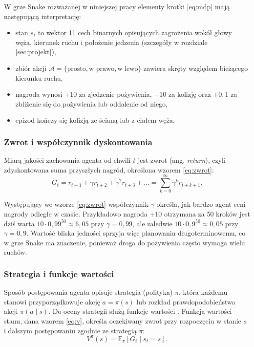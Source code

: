 W grze Snake rozważanej w niniejszej pracy elementy krotki \eqref{eq:mdp} mają następującą interpretację:
\begin{itemize}
	\item stan $s_t$ to wektor 11 cech binarnych opisujących zagrożenia wokół głowy węża, kierunek ruchu i położenie jedzenia (szczegóły w rozdziale \ref{sec:projekt}),
	\item zbiór akcji $\mathcal{A} = \{\text{prosto}, \text{w prawo}, \text{w lewo}\}$ zawiera skręty względem bieżącego kierunku ruchu,
	\item nagroda wynosi $+10$ za zjedzenie pożywienia, $-10$ za kolizję oraz $\pm 0{,}1$ za zbliżenie się do pożywienia lub oddalenie od niego,
	\item epizod kończy się kolizją ze ścianą lub z ciałem węża.
\end{itemize}

\subsubsection{Zwrot i współczynnik dyskontowania}

Miarą jakości zachowania agenta od chwili $t$ jest zwrot (ang. \emph{return}), czyli zdyskontowana suma przyszłych nagród, określona wzorem \eqref{eq:zwrot}:
\begin{equation}
	G_t = r_{t+1} + \gamma r_{t+2} + \gamma^2 r_{t+3} + \ldots = \sum_{k=0}^{\infty} \gamma^k r_{t+k+1}.
	\label{eq:zwrot}
\end{equation}

Występujący we wzorze \eqref{eq:zwrot} współczynnik $\gamma$ określa, jak bardzo agent ceni nagrody odległe w czasie. Przykładowo nagroda $+10$ otrzymana za 50 kroków jest dziś warta $10 \cdot 0{,}99^{50} \approx 6{,}05$ przy $\gamma = 0{,}99$, ale zaledwie $10 \cdot 0{,}9^{50} \approx 0{,}05$ przy $\gamma = 0{,}9$. Wartość bliska jedności sprzyja więc planowaniu długoterminowemu, co w grze Snake ma znaczenie, ponieważ droga do pożywienia często wymaga wielu ruchów.

\subsubsection{Strategia i funkcje wartości}

Sposób postępowania agenta opisuje strategia (polityka) $\pi$, która każdemu stanowi przyporządkowuje akcję $a = \pi(s)$ lub rozkład prawdopodobieństwa akcji $\pi(a \mid s)$. Do oceny strategii służą funkcje wartości \cite{sutton2018}. Funkcja wartości stanu, dana wzorem \eqref{eq:v}, określa oczekiwany zwrot przy rozpoczęciu w stanie $s$ i dalszym postępowaniu zgodnie ze strategią $\pi$:
\begin{equation}
	V^{\pi}(s) = \mathbb{E}_{\pi}\left[ G_t \mid s_t = s \right].
	\label{eq:v}
\end{equation}

